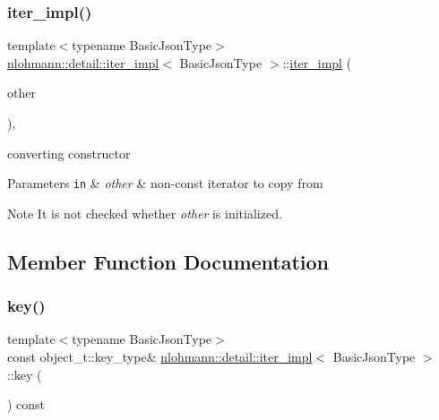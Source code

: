\subsubsection{\texorpdfstring{iter\+\_\+impl()}{iter\_impl()}\hspace{0.1cm}{\footnotesize\ttfamily [4/4]}}
{\footnotesize\ttfamily template$<$typename Basic\+Json\+Type$>$ \\
\hyperlink{classnlohmann_1_1detail_1_1iter__impl}{nlohmann\+::detail\+::iter\+\_\+impl}$<$ Basic\+Json\+Type $>$\+::\hyperlink{classnlohmann_1_1detail_1_1iter__impl}{iter\+\_\+impl} (\begin{DoxyParamCaption}\item[{const \hyperlink{classnlohmann_1_1detail_1_1iter__impl}{iter\+\_\+impl}$<$ typename std\+::remove\+\_\+const$<$ Basic\+Json\+Type $>$\+::type $>$ \&}]{other }\end{DoxyParamCaption})\hspace{0.3cm}{\ttfamily [inline]}, {\ttfamily [noexcept]}}



converting constructor 


\begin{DoxyParams}[1]{Parameters}
\mbox{\tt in}  & {\em other} & non-\/const iterator to copy from \\
\hline
\end{DoxyParams}
\begin{DoxyNote}{Note}
It is not checked whether {\itshape other} is initialized. 
\end{DoxyNote}


\subsection{Member Function Documentation}
\mbox{\label{classnlohmann_1_1detail_1_1iter__impl_a15dfb2744fed2ef40c12a9e9a20d6dbc}} 
\subsubsection{\texorpdfstring{key()}{key()}}
{\footnotesize\ttfamily template$<$typename Basic\+Json\+Type$>$ \\
const object\+\_\+t\+::key\+\_\+type\& \hyperlink{classnlohmann_1_1detail_1_1iter__impl}{nlohmann\+::detail\+::iter\+\_\+impl}$<$ Basic\+Json\+Type $>$\+::key (\begin{DoxyParamCaption}{ }\end{DoxyParamCaption}) const\hspace{0.3cm}{\ttfamily [inline]}}



